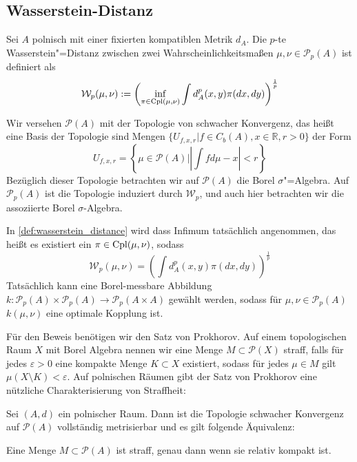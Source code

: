 \subsection{Wasserstein-Distanz}
\begin{definition}\label{def:wasserstein_distance}
    Sei $A$ polnisch mit einer fixierten kompatiblen Metrik $d_A$. Die $p$-te Wasserstein"=Distanz zwischen zwei Wahrscheinlichkeitsmaßen $\mu, \nu \in \mathcal{P}_p(A)$ ist definiert als
    $$\mathcal{W}_p(\mu, \nu) := \left( \inf_{\pi \in \operatorname{Cpl}(\mu, \nu)} \int d^p_A(x, y) \pi(dx, dy) \right)^\frac{1}{p}$$
\end{definition}
Wir versehen $\mathcal{P}(A)$ mit der Topologie von schwacher Konvergenz, das heißt eine Basis der Topologie sind Mengen $\{U_{f, x, r} \vert f \in C_b(A), x\in \mathbb{R}, r>0\}$ der Form 
$$U_{f, x, r} = \left\{ \mu \in \mathcal{P}(A) \vert \left| \int f d\mu - x\right| < r\right\}$$
Bezüglich dieser Topologie betrachten wir auf $\mathcal{P}(A)$ die Borel $\sigma$"=Algebra. Auf $\mathcal{P}_p(A)$ ist die Topologie induziert durch $\mathcal{W}_p$, und auch hier betrachten wir die assoziierte Borel $\sigma$-Algebra.
\begin{lemma}\label{thm:optimal_coupling}
In \ref{def:wasserstein_distance} wird dass Infimum tatsächlich angenommen, das heißt es existiert ein $\pi \in \operatorname{Cpl}(\mu, \nu)$, sodass
$$\mathcal{W}_p(\mu, \nu) = \left( \int d^p_A(x, y) \pi(dx, dy) \right)^{\frac{1}{p}}$$
Tatsächlich kann eine Borel-messbare Abbildung $k: \mathcal{P}_p(A) \times \mathcal{P}_p(A) \rightarrow \mathcal{P}_p(A\times A)$ gewählt werden, sodass für $\mu,\nu \in \mathcal{P}_p(A)$ $k(\mu, \nu)$ eine optimale Kopplung ist.
\end{lemma}
Für den Beweis benötigen wir den Satz von Prokhorov. Auf einem topologischen Raum $X$ mit Borel Algebra nennen wir eine Menge $M \subset \mathcal{P}(X)$ straff, falls für jedes $\varepsilon >0$ eine kompakte Menge $K\subset X$ existiert, sodass für jedes $\mu \in M$ gilt $\mu(X\setminus K) < \varepsilon$. Auf polnischen Räumen gibt der Satz von Prokhorov eine nützliche Charakterisierung von Straffheit:
\begin{theorem}
Sei $(A, d)$ ein polnischer Raum. Dann ist die Topologie schwacher Konvergenz auf $\mathcal{P}(A)$ vollständig metrisierbar und es gilt folgende Äquivalenz:

Eine Menge $M \subset \mathcal{P}(A)$ ist straff, genau dann wenn sie relativ kompakt ist.
\end{theorem}
